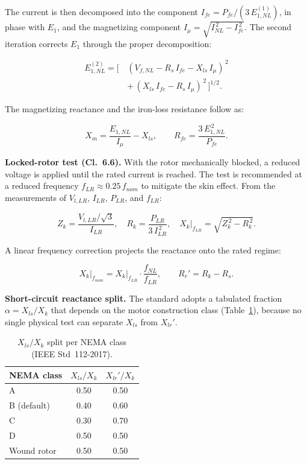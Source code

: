 \documentclass[a4paper]{ifacconf}
\begin{document}
\noindent The current is then decomposed into the component $I_{fe} = P_{fe}/(3\,E_{1,NL}^{(1)})$, in phase with $E_1$, and the magnetizing component $I_\mu = \sqrt{I_{NL}^{\,2} - I_{fe}^{\,2}}$. The second iteration corrects $E_1$ through the proper decomposition:

\begin{equation}
\label{eq:ieee_e1_iter2_en}
\begin{split}
E_{1,NL}^{(2)} = \big[\,&(V_{f,NL} - R_s\,I_{fe} - X_{ls}\,I_\mu)^{\,2} \\
&+\, (X_{ls}\,I_{fe} - R_s\,I_\mu)^{\,2}\,\big]^{1/2}.
\end{split}
\end{equation}

\noindent The magnetizing reactance and the iron-loss resistance follow as:

\begin{equation}
\label{eq:ieee_xm_rfe_en}
X_m = \frac{E_{1,NL}}{I_\mu} - X_{ls}, \qquad R_{fe} = \frac{3\,E_{1,NL}^{\,2}}{P_{fe}}.
\end{equation}

\textbf{Locked-rotor test (Cl.~6.6).} With the rotor mechanically blocked, a reduced voltage is applied until the rated current is reached. The test is recommended at a reduced frequency $f_{LR} \approx 0.25\,f_{nom}$ to mitigate the skin effect. From the measurements of $V_{l,LR}$, $I_{LR}$, $P_{LR}$, and $f_{LR}$:

\begin{equation}
\label{eq:ieee_zk_en}
Z_k = \frac{V_{l,LR}/\sqrt{3}}{I_{LR}}, \quad R_k = \frac{P_{LR}}{3\,I_{LR}^{\,2}}, \quad X_k\big|_{f_{LR}} = \sqrt{Z_k^{\,2} - R_k^{\,2}}.
\end{equation}

\noindent A linear frequency correction projects the reactance onto the rated regime:

\begin{equation}
\label{eq:ieee_xk_corr_en}
X_k\big|_{f_{nom}} = X_k\big|_{f_{LR}} \cdot \frac{f_{NL}}{f_{LR}}, \qquad R_r' = R_k - R_s.
\end{equation}

\textbf{Short-circuit reactance split.} The standard adopts a tabulated fraction $\alpha = X_{ls}/X_k$ that depends on the motor construction class (Table~\ref{tab:nema_split_en}), because no single physical test can separate $X_{ls}$ from $X_{lr}'$.

\begin{table}[htbp]
\centering
\caption{$X_{ls}/X_k$ split per NEMA class (IEEE Std~112-2017).}
\label{tab:nema_split_en}
\begin{tabular}{lcc}
\hline
\textbf{NEMA class} & $X_{ls}/X_k$ & $X_{lr}'/X_k$ \\ \hline
A & 0.50 & 0.50 \\
B (default) & 0.40 & 0.60 \\
C & 0.30 & 0.70 \\
D & 0.50 & 0.50 \\
Wound rotor & 0.50 & 0.50 \\ \hline
\end{tabular}
\end{table}
\end{document}
